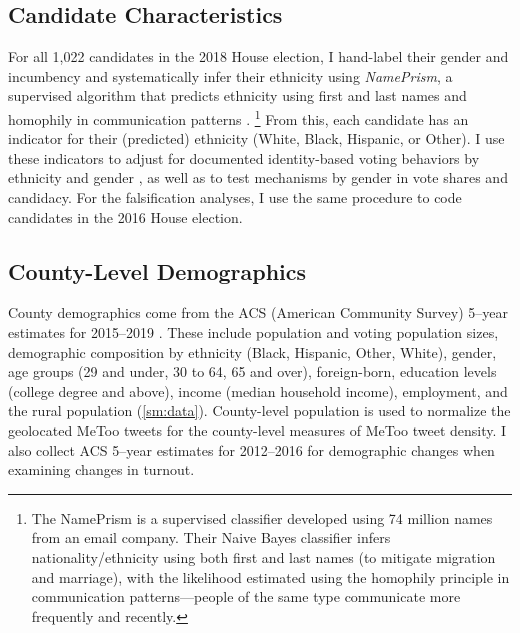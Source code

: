 \documentclass[manuscript,screen,nonacm,11pt,acm]{acmart}
\begin{document}
\subsection{Candidate Characteristics}
For all 1,022 candidates in the 2018 House election, I hand-label their gender and incumbency and systematically infer their ethnicity using \emph{NamePrism}, a supervised algorithm that predicts ethnicity using first and last names and homophily in communication patterns \citep{NamePrism}.%
\footnote{The NamePrism is a supervised classifier developed using 74 million names from an email company. Their Naive Bayes classifier infers nationality/ethnicity using both first and last names (to mitigate migration and marriage), with the likelihood estimated using the homophily principle in communication patterns---people of the same type communicate more frequently and recently.}
From this, each candidate has an indicator for their (predicted) ethnicity (White, Black, Hispanic, or Other).
I use these indicators to adjust for documented identity-based voting behaviors by ethnicity and gender \citep{Abrajano2005, Flanagan2018, HOLLI2010, Matsubayashi2011, Stephens-Davidowitz2014}, as well as to test mechanisms by gender in vote shares and candidacy.
For the falsification analyses, I use the same procedure to code candidates in the 2016 House election.

\subsection{County-Level Demographics}
\label{sec:ACS}
County demographics come from the ACS (American Community Survey) 5--year estimates for 2015--2019 \citep{ipums_nhgis}.
These include population and voting population sizes, demographic composition by ethnicity (Black, Hispanic, Other, White), gender, age groups (29 and under, 30 to 64, 65 and over), foreign-born, education levels (college degree and above), income (median household income), employment, and the rural population (\cref{sm:data}).
County-level population is used to normalize the geolocated MeToo tweets for the county-level measures of MeToo tweet density.
I also collect ACS 5--year estimates for 2012--2016 for demographic changes when examining changes in turnout.

\end{document}
